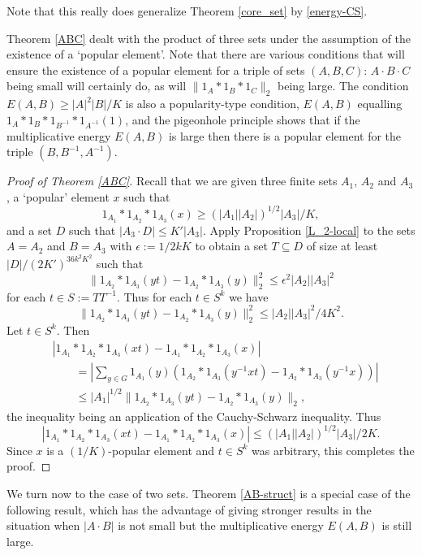 \documentclass[12pt,a4paper,reqno]{amsart}
\numberwithin{equation}{section}
\theoremstyle{plain}
\theoremstyle{definition}
\renewcommand{\leq}{\leqslant}
\renewcommand{\geq}{\geqslant}
\renewcommand{\subset}{\subseteq}
\providecommand{\norm}[1]{\lVert#1\rVert}
\begin{document}
Note that this really does generalize Theorem \ref{core_set} by \eqref{energy-CS}.

Theorem \ref{ABC} dealt with the product of three sets under the assumption of the existence of a `popular element'. Note that there are various conditions that will ensure the existence of a popular element for a triple of sets $(A,B,C)$: $A \cdot B \cdot C$ being small will certainly do, as will $\norm{1_A*1_B*1_C}_2$ being large. The condition $E(A,B) \geq |A|^2|B|/K$ is also a popularity-type condition, $E(A,B)$ equalling $1_A*1_B*1_{B^{-1}}*1_{A^{-1}}(1)$, and the pigeonhole principle shows that if the multiplicative energy $E(A,B)$ is large then there is a popular element for the triple $(B, B^{-1}, A^{-1})$.

\begin{proof}[Proof of Theorem \ref{ABC}]
Recall that we are given three finite sets $A_1$, $A_2$ and $A_3$, a `popular' element $x$ such that
\[ 1_{A_1}*1_{A_2}*1_{A_3}(x) \geq (|A_1||A_2|)^{1/2}|A_3|/K, \]
and a set $D$ such that $|A_3 \cdot D| \leq K'|A_3|$. Apply Proposition \ref{L_2-local} to the sets $A = A_2$ and $B = A_3$ with $\epsilon := 1/2kK$ to obtain a set $T \subset D$ of size at least $|D|/(2K')^{36k^2 K^2}$ such that
\[ \norm{ 1_{A_2}*1_{A_3}(yt) - 1_{A_2}*1_{A_3}(y) }_2^2 \leq \epsilon^2 |A_2||A_3|^2 \]
for each $t \in S := TT^{-1}$. Thus for each $t \in S^k$ we have
\[ \norm{ 1_{A_2}*1_{A_3}(yt) - 1_{A_2}*1_{A_3}(y) }_2^2 \leq |A_2||A_3|^2/4K^2. \]
Let $t \in S^k$. Then
\begin{align*}
&| 1_{A_1}*1_{A_2}*1_{A_3}(xt) - 1_{A_1}*1_{A_2}*1_{A_3}(x) | \\
&\qquad= \left| \sum_{y \in G} 1_{A_1}(y) \left( 1_{A_2}*1_{A_3}(y^{-1}xt) - 1_{A_2}*1_{A_3}(y^{-1}x) \right) \right| \\
&\qquad\leq |A_1|^{1/2} \norm{ 1_{A_2}*1_{A_3}(yt) - 1_{A_2}*1_{A_3}(y) }_2,
\end{align*}
the inequality being an application of the Cauchy-Schwarz inequality. Thus
\[ | 1_{A_1}*1_{A_2}*1_{A_3}(xt) - 1_{A_1}*1_{A_2}*1_{A_3}(x) | \leq (|A_1||A_2|)^{1/2}|A_3|/2K. \]
Since $x$ is a $(1/K)$-popular element and $t \in S^k$ was arbitrary, this completes the proof.
\end{proof}

We turn now to the case of two sets. Theorem \ref{AB-struct} is a special case of the following result, which has the advantage of giving stronger results in the situation when $|A \cdot B|$ is not small but the multiplicative energy $E(A,B)$ is still large.
\end{document}
